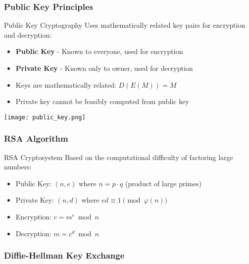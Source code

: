 \subsubsection{Public Key Principles}

\begin{definition}{Public Key Cryptography}
    Uses mathematically related key pairs for encryption and decryption:
    \begin{itemize}
        \item \textbf{Public Key} - Known to everyone, used for encryption
        \item \textbf{Private Key} - Known only to owner, used for decryption
        \item Keys are mathematically related: $D(E(M)) = M$
        \item Private key cannot be feasibly computed from public key
    \end{itemize}
    \texttt{[image: public\_key.png]}
\end{definition}

\subsubsection{RSA Algorithm}

\begin{definition}{RSA Cryptosystem}
    Based on the computational difficulty of factoring large numbers:
    \begin{itemize}
        \item Public Key: $(n, e)$ where $n = p \cdot q$ (product of large primes)
        \item Private Key: $(n, d)$ where $ed \equiv 1 \pmod{\varphi(n)}$
        \item Encryption: $c = m^e \bmod n$
        \item Decryption: $m = c^d \bmod n$
    \end{itemize}
\end{definition}

\subsubsection{Diffie-Hellman Key Exchange}

